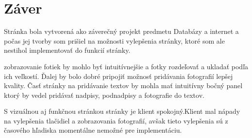 \chapter{Záver}

Stránka bola vytvorená ako záverečný projekt predmetu Databázy a internet a počas jej tvorby som prišiel na možnosti vylepšenia stránky, ktoré som ale nestihol implementovať do funkcií stránky.

zobrazovanie fotiek by mohlo byť intuitívnejšie a fotky rozdeľovať a ukladať podľa ich veľkostí. Ďalej by bolo dobré pripojiť možnosť pridávania fotografií lepšej kvality. Časť stránky na pridávanie textov by mohla mať intuitívny bočný panel ktorý by vedel pridávať nadpisy, podnadpisy a fotografie do textov.

S vizuálnou aj funkčnou stránkou stránky je klient spokojný.Klient mal nápady na vylepšenia tlačidiel a zobrazovania fotografií, avšak tieto vylepšenia sú z časového hľadiska momentálne nemožné pre implementáciu.

\nocite{all}
\nocite{website}
\nocite{admin}
\nocite{pdf}
